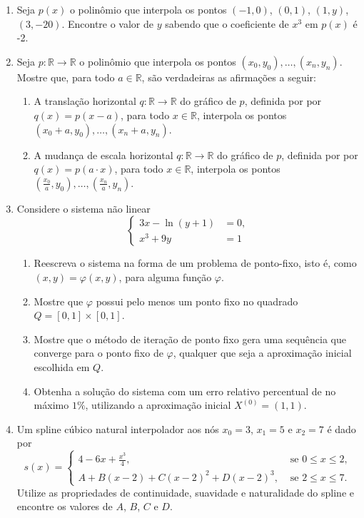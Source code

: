 \documentclass[12pt,a4paper]{article}
\newcommand*\R{\mathbb{R}}
\begin{document}
\begin{enumerate}
\item Seja $p(x)$ o polinômio que interpola os pontos $(-1, 0)$, $(0, 1)$, $(1, y)$, $(3, -20)$. Encontre o valor de $y$ sabendo que o coeficiente de $x^3$ em $p(x)$ é -2.

\item Seja $p:\R \to \R$ o polinômio que interpola os pontos $(x_0, y_0), \ldots, (x_n, y_n)$. Mostre que, para todo $a \in \R$, são verdadeiras as afirmações a seguir:
\begin{enumerate}
\item A translação horizontal $q:\R \to \R$ do gráfico de $p$, definida por por $q(x) = p(x - a)$, para todo $x \in \R$, interpola os pontos $(x_0+a, y_0), \ldots, (x_n+a, y_n)$.
\item A mudança de escala horizontal $q:\R \to \R$ do gráfico de $p$, definida por por $q(x) = p(a \cdot x)$, para todo $x \in \R$, interpola os pontos $(\frac{x_0}{a}, y_0), \ldots, (\frac{x_n}{a}, y_n)$.
\end{enumerate}

\item Considere o sistema não linear
\[
\begin{cases}
3x - \ln(y + 1) &= 0,\\
x^3 + 9y &= 1
\end{cases}
\]
\begin{enumerate}
\item Reescreva o sistema na forma de um problema de ponto-fixo, isto é, como $(x,y) = \varphi(x,y)$, para alguma função $\varphi$.
\item Mostre que $\varphi$ possui pelo menos um ponto fixo no quadrado $Q = [0,1] \times [0,1]$.
\item Mostre que o método de iteração de ponto fixo gera uma sequência que converge para o ponto fixo de $\varphi$, qualquer que seja a aproximação inicial escolhida em $Q$.
\item Obtenha a solução do sistema com um erro relativo percentual de no máximo $1\%$, utilizando a aproximação inicial $X^{(0)} = (1, 1)$.
\end{enumerate}

\item Um spline cúbico natural interpolador aos nós $x_0 = 3$, $x_1 = 5$ e $x_2 = 7$ é dado por
\[
   s(x) =
   \begin{cases}
      4 - 6x + \frac{x^3}{4}, & \text{ se } 0 \leq x \leq 2,\\
      A + B(x - 2) + C(x - 2)^2 + D(x - 2)^3, & \text{ se } 2 \leq x \leq 7.
   \end{cases}
\]
Utilize as propriedades de continuidade, suavidade e naturalidade do spline e encontre os valores de $A$, $B$, $C$ e $D$.


\end{enumerate}
\end{document}
